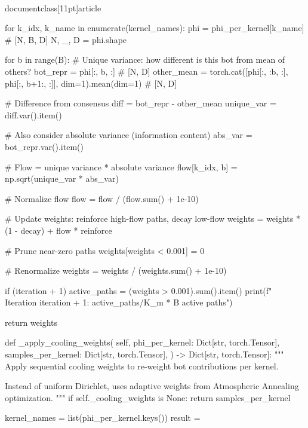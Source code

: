 \\documentclass[11pt]{article}
\begin{document}
\begin{CodeBlock}
{{{{            for k_idx, k_name in enumerate(kernel_names):
                phi = phi_per_kernel[k_name]  # [N, B, D]
                N, _, D = phi.shape
                
                for b in range(B):
                    # Unique variance: how different is this bot from mean of others?
                    bot_repr = phi[:, b, :]  # [N, D]
                    other_mean = torch.cat([phi[:, :b, :], phi[:, b+1:, :]], dim=1).mean(dim=1)  # [N, D]
                    
                    # Difference from consensus
                    diff = bot_repr - other_mean
                    unique_var = diff.var().item()
                    
                    # Also consider absolute variance (information content)
                    abs_var = bot_repr.var().item()
                    
                    # Flow = unique variance * absolute variance
                    flow[k_idx, b] = np.sqrt(unique_var * abs_var)
            
            # Normalize flow
            flow = flow / (flow.sum() + 1e-10)
            
            # Update weights: reinforce high-flow paths, decay low-flow
            weights = weights * (1 - decay) + flow * reinforce
            
            # Prune near-zero paths
            weights[weights < 0.001] = 0
            
            # Renormalize
            weights = weights / (weights.sum() + 1e-10)
            
            if (iteration + 1) %
                active_paths = (weights > 0.001).sum().item()
                print(f"  Iteration {iteration + 1}: {active_paths}/{K_m * B} active paths")
        
        return weights
    
    def _apply_cooling_weights(
        self,
        phi_per_kernel: Dict[str, torch.Tensor],
        samples_per_kernel: Dict[str, torch.Tensor],
    ) -> Dict[str, torch.Tensor]:
        """
        Apply sequential cooling weights to re-weight bot contributions per kernel.

        Instead of uniform Dirichlet, uses adaptive weights from Atmospheric Annealing optimization.
        """
        if self._cooling_weights is None:
            return samples_per_kernel
        
        kernel_names = list(phi_per_kernel.keys())
        result = {}
        
}}}}
\end{CodeBlock}
\end{document}
